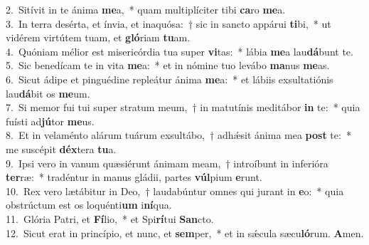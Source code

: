 {2.~}Sitívit in te ánima \textbf{me}a,~* quam multiplíciter tibi \textbf{ca}ro \textbf{me}a.\\
{3.~}In terra desérta, et ínvia, et inaquósa:~† sic in sancto appárui \textbf{ti}bi,~* ut vidérem virtútem tuam, et \textbf{gló}riam \textbf{tu}am.\\
{4.~}Quóniam mélior est misericórdia tua super \textbf{vi}tas:~* lábia \textbf{me}a lau\textbf{dá}bunt te.\\
{5.~}Sic benedícam te in vita \textbf{me}a:~* et in nómine tuo levábo \textbf{ma}nus \textbf{me}as.\\
{6.~}Sicut ádipe et pinguédine repleátur ánima \textbf{me}a:~* et lábiis exsultatiónis lau\textbf{dá}bit os \textbf{me}um.\\
{7.~}Si memor fui tui super stratum meum,~† in matutínis meditábor \textbf{in} te:~* quia fuísti ad\textbf{jú}tor \textbf{me}us.\\
{8.~}Et in velaménto alárum tuárum exsultábo,~† adhǽsit ánima mea \textbf{post} te:~* me suscépit \textbf{déx}tera \textbf{tu}a.\\
{9.~}Ipsi vero in vanum quæsiérunt ánimam meam,~† introíbunt in inferióra \textbf{ter}ræ:~* tradéntur in manus gládii, partes \textbf{vúl}pium \textbf{e}runt.\\
{10.~}Rex vero lætábitur in Deo,~† laudabúntur omnes qui jurant in \textbf{e}o:~* quia obstrúctum est os loquénti\textbf{um} i\textbf{ní}qua.\\
{11.~}Glória Patri, et \textbf{Fí}lio,~* et Spi\textbf{rí}tui \textbf{San}cto.\\
{12.~}Sicut erat in princípio, et nunc, et \textbf{sem}per,~* et in sǽcula sæcu\textbf{ló}rum. \textbf{A}men.\\
